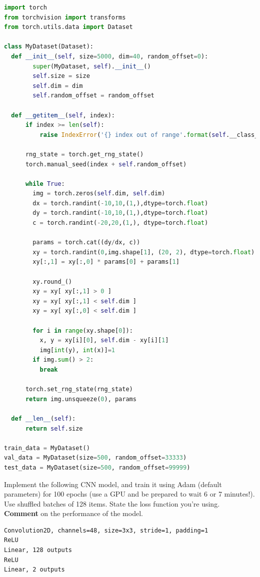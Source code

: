 \documentclass[a4paper]{article}
\begin{document}
\begin{lstlisting}[language=Python]
import torch
from torchvision import transforms
from torch.utils.data import Dataset

class MyDataset(Dataset):
  def __init__(self, size=5000, dim=40, random_offset=0):
        super(MyDataset, self).__init__()
        self.size = size
        self.dim = dim
        self.random_offset = random_offset

  def __getitem__(self, index):
      if index >= len(self):
          raise IndexError('{} index out of range'.format(self.__class__.__name__))
      
      rng_state = torch.get_rng_state()
      torch.manual_seed(index + self.random_offset)
      
      while True:
        img = torch.zeros(self.dim, self.dim)
        dx = torch.randint(-10,10,(1,),dtype=torch.float)
        dy = torch.randint(-10,10,(1,),dtype=torch.float)
        c = torch.randint(-20,20,(1,), dtype=torch.float)
        
        params = torch.cat((dy/dx, c))
        xy = torch.randint(0,img.shape[1], (20, 2), dtype=torch.float)
        xy[:,1] = xy[:,0] * params[0] + params[1]

        xy.round_()
        xy = xy[ xy[:,1] > 0 ]
        xy = xy[ xy[:,1] < self.dim ]
        xy = xy[ xy[:,0] < self.dim ]

        for i in range(xy.shape[0]):
          x, y = xy[i][0], self.dim - xy[i][1]
          img[int(y), int(x)]=1
        if img.sum() > 2:
          break

      torch.set_rng_state(rng_state)
      return img.unsqueeze(0), params

  def __len__(self):
      return self.size
  
train_data = MyDataset()
val_data = MyDataset(size=500, random_offset=33333)
test_data = MyDataset(size=500, random_offset=99999)
\end{lstlisting}

\begin{tcolorbox}[title=1.1 A simple CNN baseline (2 marks)]
Implement the following CNN model, and train it using Adam (default parameters) for 100 epochs (use a GPU and be prepared to wait 6 or 7 minutes!). Use shuffled batches of 128 items. State the loss function you're using. \textbf{Comment} on the performance of the model.

\begin{lstlisting}
Convolution2D, channels=48, size=3x3, stride=1, padding=1
ReLU
Linear, 128 outputs
ReLU
Linear, 2 outputs
\end{lstlisting}
\end{tcolorbox}
\end{document}

